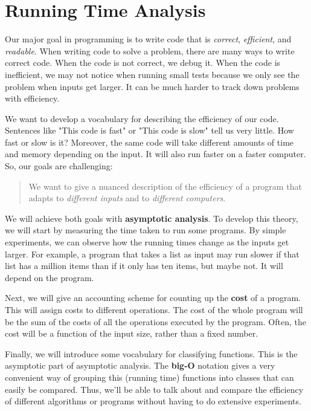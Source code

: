 \chapter{Running Time Analysis}


Our major goal in programming is to write code that is \emph{correct}, \emph{efficient}, and \emph{readable}.
When writing code to solve a problem, there are many ways to write correct code.
When the code is not correct, we debug it.
When the code is inefficient, we may not notice when running small tests because we only see the problem when inputs get larger.
It can be much harder to track down problems with efficiency.


We want to develop a vocabulary for describing the efficiency of our code.
Sentences like "This code is fast" or "This code is slow" tell us very little.
How fast or slow is it?
Moreover, the same code will take different amounts of time and memory depending on the input.
It will also run faster on a faster computer.
So, our goals are challenging:

\begin{quote}

We want to give a nuanced description of the efficiency of a program that adapts to \emph{different inputs} and to \emph{different computers}.

\end{quote}

We will achieve both goals with \textbf{asymptotic analysis}.
To develop this theory, we will start by measuring the time taken to run some programs.
By simple experiments, we can observe how the running times change as the inputs get larger.
For example, a program that takes a list as input may run slower if that list has a million items than if it only has ten items, but maybe not.
It will depend on the program.


Next, we will give an accounting scheme for counting up the \textbf{cost} of a program.
This will assign costs to different operations.
The cost of the whole program will be the sum of the costs of all the operations executed by the program.
Often, the cost will be a function of the input size, rather than a fixed number.


Finally, we will introduce some vocabulary for classifying functions.
This is the asymptotic part of asymptotic analysis.
The \textbf{big-O} notation gives a very convenient way of grouping this (running time) functions into classes that can easily be compared.
Thus, we'll be able to talk about and compare the efficiency of different algorithms or programs without having to do extensive experiments.


